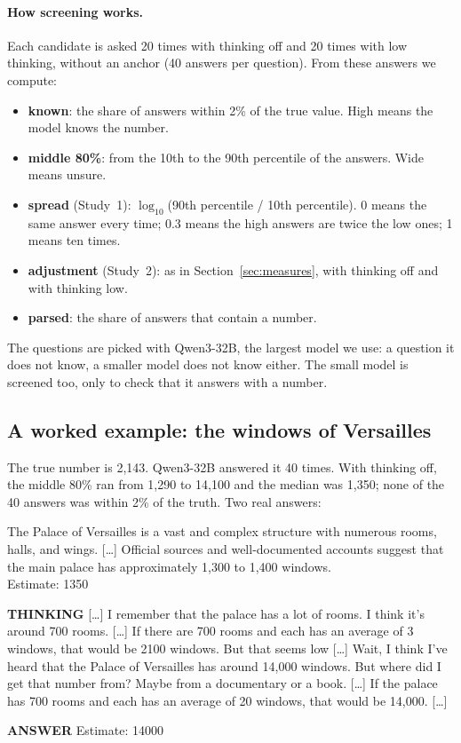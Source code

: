 \documentclass[11pt,a4paper]{article}
\newcommand{\who}[1]{\par\smallskip\noindent\textsf{\textbf{\footnotesize\MakeUppercase{#1}}}\quad}
\newcommand{\cut}{\textup{[\dots]}}
\begin{document}
\paragraph{How screening works.} Each candidate is asked 20 times with thinking off and 20 times with low thinking, without an anchor (40 answers per question). From these answers we compute:
\begin{itemize}
  \item \textbf{known}: the share of answers within 2\% of the true value. High means the model knows the number.
  \item \textbf{middle 80\%}: from the 10th to the 90th percentile of the answers. Wide means unsure.
  \item \textbf{spread} (Study~1): $\log_{10}$(90th percentile / 10th percentile). 0 means the same answer every time; 0.3 means the high answers are twice the low ones; 1 means ten times.
  \item \textbf{adjustment} (Study~2): as in Section~\ref{sec:measures}, with thinking off and with thinking low.
  \item \textbf{parsed}: the share of answers that contain a number.
\end{itemize}
The questions are picked with Qwen3-32B, the largest model we use: a question it does not know, a smaller model does not know either. The small model is screened too, only to check that it answers with a number.

\subsection{A worked example: the windows of Versailles}

The true number is 2,143. Qwen3-32B answered it 40 times. With thinking off, the middle 80\% ran from 1,290 to 14,100 and the median was 1,350; none of the 40 answers was within 2\% of the truth. Two real answers:

\begin{transcript}
The Palace of Versailles is a vast and complex structure with numerous rooms, halls, and wings. \cut{} Official sources and well-documented accounts suggest that the main palace has approximately 1,300 to 1,400 windows.\\ Estimate: 1350
\end{transcript}

\begin{transcript}
\who{Thinking} \cut{} I remember that the palace has a lot of rooms. I think it's around 700 rooms. \cut{} If there are 700 rooms and each has an average of 3 windows, that would be 2100 windows. But that seems low \cut{} Wait, I think I've heard that the Palace of Versailles has around 14,000 windows. But where did I get that number from? Maybe from a documentary or a book. \cut{} If the palace has 700 rooms and each has an average of 20 windows, that would be 14,000. \cut{}
\who{Answer} Estimate: 14000
\end{transcript}
\end{document}
